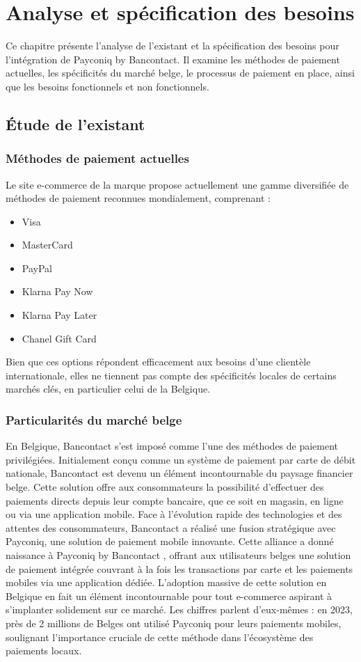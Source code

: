 
\chapter{Analyse et spécification des besoins}
\label{chap:Analyse et spécification des besoins}

Ce chapitre présente l'analyse de l'existant et la spécification des besoins pour l'intégration de Payconiq by Bancontact. Il examine les méthodes de paiement actuelles, les spécificités du marché belge, le processus de paiement en place, ainsi que les besoins fonctionnels et non fonctionnels.
\pagebreak

\section{Étude de l’existant}
\subsection{Méthodes de paiement actuelles}
Le site e-commerce de la marque propose actuellement une gamme diversifiée de méthodes de paiement reconnues mondialement, comprenant :
\begin{itemize}
    \item Visa
    \item MasterCard
    \item PayPal
    \item Klarna Pay Now
    \item Klarna Pay Later
    \item Chanel Gift Card
\end{itemize}
Bien que ces options répondent efficacement aux besoins d'une clientèle internationale, elles ne tiennent pas compte des spécificités locales de certains marchés clés, en particulier celui de la Belgique.
\subsection{Particularités du marché belge}
En Belgique, Bancontact s'est imposé comme l'une des méthodes de paiement privilégiées. Initialement conçu comme un système de paiement par carte de débit nationale, Bancontact est devenu un élément incontournable du paysage financier belge. Cette solution offre aux consommateurs la possibilité d'effectuer des paiements directs depuis leur compte bancaire, que ce soit en magasin, en ligne ou via une application mobile.
Face à l'évolution rapide des technologies et des attentes des consommateurs, Bancontact a réalisé une fusion stratégique avec Payconiq, une solution de paiement mobile innovante. Cette alliance a donné naissance à Payconiq by Bancontact , offrant aux utilisateurs belges une solution de paiement intégrée couvrant à la fois les transactions par carte et les paiements mobiles via une application dédiée.
L'adoption massive de cette solution en Belgique en fait un élément incontournable pour tout e-commerce aspirant à s'implanter solidement sur ce marché. Les chiffres parlent d'eux-mêmes : en 2023, près de 2 millions de Belges ont utilisé Payconiq pour leurs paiements mobiles, soulignant l'importance cruciale de cette méthode dans l'écosystème des paiements locaux.
